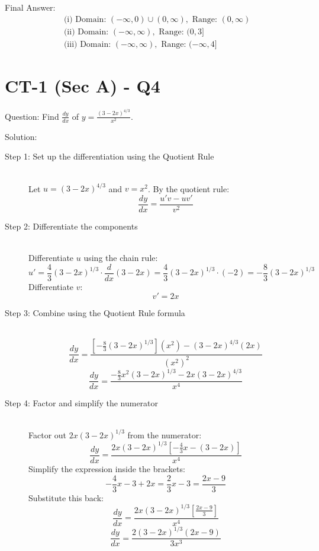 \documentclass[11pt, a4paper]{article}
\begin{document}
Final Answer:
\[ 
\boxed{
\begin{aligned}
&\text{(i) Domain: } (-\infty, 0) \cup (0, \infty), \text{ Range: } (0, \infty) \\
&\text{(ii) Domain: } (-\infty, \infty), \text{ Range: } (0, 3] \\
&\text{(iii) Domain: } (-\infty, \infty), \text{ Range: } (-\infty, 4]
\end{aligned}
} 
\]



\section*{CT-1 (Sec A) - Q4}

Question:
Find \(\frac{dy}{dx}\) of $y = \frac{(3-2x)^{4/3}}{x^2}$.

Solution:

\begin{description}
    \item[Step 1: Set up the differentiation using the Quotient Rule] \ \\
    Let $u = (3-2x)^{4/3}$ and $v = x^2$.
    By the quotient rule:
    \[ \frac{dy}{dx} = \frac{u'v - uv'}{v^2} \]

    \item[Step 2: Differentiate the components] \ \\
    Differentiate $u$ using the chain rule:
    \[ u' = \frac{4}{3}(3-2x)^{1/3} \cdot \frac{d}{dx}(3-2x) = \frac{4}{3}(3-2x)^{1/3} \cdot (-2) = -\frac{8}{3}(3-2x)^{1/3} \]
    Differentiate $v$:
    \[ v' = 2x \]

    \item[Step 3: Combine using the Quotient Rule formula] \ \\
    \[ \frac{dy}{dx} = \frac{\left[-\frac{8}{3}(3-2x)^{1/3}\right](x^2) - (3-2x)^{4/3}(2x)}{(x^2)^2} \]
    \[ \frac{dy}{dx} = \frac{-\frac{8}{3}x^2(3-2x)^{1/3} - 2x(3-2x)^{4/3}}{x^4} \]

    \item[Step 4: Factor and simplify the numerator] \ \\
    Factor out $2x(3-2x)^{1/3}$ from the numerator:
    \[ \frac{dy}{dx} = \frac{2x(3-2x)^{1/3} \left[ -\frac{4}{3}x - (3-2x) \right]}{x^4} \]
    Simplify the expression inside the brackets:
    \[ -\frac{4}{3}x - 3 + 2x = \frac{2}{3}x - 3 = \frac{2x - 9}{3} \]
    Substitute this back:
    \[ \frac{dy}{dx} = \frac{2x(3-2x)^{1/3} \left[ \frac{2x - 9}{3} \right]}{x^4} \]
    \[ \frac{dy}{dx} = \frac{2(3-2x)^{1/3}(2x-9)}{3x^3} \]
\end{description}
\end{document}
